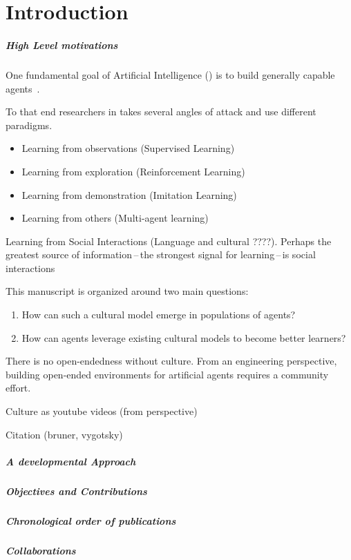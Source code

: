 
\chapter{Introduction}

\minitoc
{}


\paragraph{High Level motivations}

One fundamental goal of Artificial Intelligence (\ai) is to build generally capable agents~\citep{team2021open}.

To that end researchers in \ai takes several angles of attack and use different paradigms.

\begin{itemize}
\item Learning from observations (Supervised Learning)
\item Learning from exploration (Reinforcement Learning)
\item Learning from demonstration (Imitation Learning)
\item Learning from others (Multi-agent learning)
\end{itemize}
Learning from Social Interactions (Language and cultural ????). Perhaps the greatest source of information\,--\,the strongest signal for learning\,--\,is social interactions 

This manuscript is organized around two main questions:
%
\begin{enumerate}
	\item How can such a cultural model emerge in populations of agents?
	\item How can agents leverage existing cultural models to become better learners? 
\end{enumerate}

There is no open-endedness without culture. From an engineering perspective, building open-ended environments for artificial agents requires a community effort.

Culture as youtube videos (from perspective)

Citation (bruner, vygotsky)

\paragraph{A developmental Approach}

\paragraph{Objectives and Contributions}

\clearpage

\paragraph{Chronological order of publications}

\paragraph{Collaborations}



